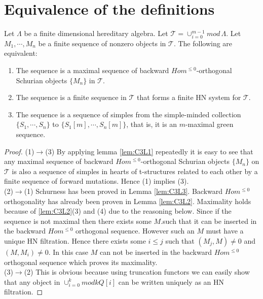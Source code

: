 \section{Equivalence of the definitions}
\begin{theorem}\label{C3TB}
\indent Let $\Lambda$ be a finite dimensional hereditary algebra. Let $\mathcal{T} = \cup_{i=0}^{m-1} mod\,\Lambda$. Let $M_1,\cdots, M_n$ be a finite sequence of nonzero objects in $\mathcal{T}$. The following are equivalent:
\begin{enumerate}
\item The sequence is a maximal sequence of backward $Hom^{\leq 0}$-orthogonal Schurian objects $\{M_n\}$ in $\mathcal{T}$.
\item The sequence is a finite sequence in $\mathcal{T}$ that forms a finite HN system for $\mathcal{T}$.
\item The sequence is a sequence of simples from the simple-minded collection $\{S_1,\cdots, S_n\}$ to  $\{S_1[m],\cdots, S_n[m]\}$, that is, it is an $m$-maximal green sequence.
\end{enumerate}
\end{theorem}
\begin{proof}
\indent (1)$\to$(3) By applying lemma \ref{lem:C3L1} repeatedly it is easy to see that any maximal sequence of backward $Hom^{\leq 0}$-orthogonal Schurian objects $\{M_n\}$ on $\mathcal{T}$ is also a sequence of simples in hearts of t-structures related to each other by a finite sequence of forward mutations. Hence (1) implies (3).\\
\indent (2)$\to$(1) Schurness has been proved in Lemma \ref{lem:C3L3}. Backward $Hom^{\leq 0}$ orthogonality has already been proven in Lemma \ref{lem:C3L2}. Maximality holds because of \ref{lem:C3L2}(3) and (4) due to the reasoning below. Since if the sequence is not maximal then there exists some $M$.such that it can be inserted in the backward $Hom^{\leq 0}$ orthogonal sequence. However such an $M$ must have a unique HN filtration. Hence there exists some $i\leq j$ such that $(M_j, M)\neq 0$ and $(M, M_i)\neq 0$. In this case $M$ can not be inserted in the backward $Hom^{\leq 0}$ orthogonal sequence which proves its maximality.\\
\indent (3)$\to$(2) This is obvious because using truncation functors we can easily show that any object in $\cup_{i=0}^k mod kQ[i]$ can be written uniquely as an HN filtration. 
\end{proof}